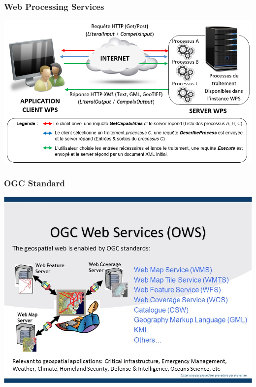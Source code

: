 \begin{frame}

\frametitle{Web Processing Services}
\begin{center}
 \includegraphics[width=\textwidth]{./images/wps_principe_fr.png}
\end{center}

\end{frame}


\begin{frame}

\frametitle{OGC Standard}

\includegraphics[width=\textwidth]{./images/OGC_webservices.jpg}


\end{frame}

